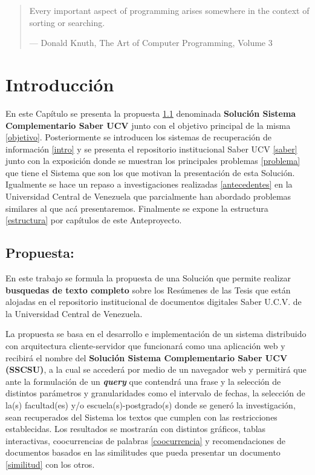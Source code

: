 \documentclass[
  10,
  openany]{book}
\begin{document}
\begin{quote}
Every important aspect of programming arises somewhere in the context of sorting or searching.

--- Donald Knuth, The Art of Computer Programming, Volume 3
\end{quote}

\hypertarget{introduccion}{%
\chapter{Introducción}\label{introduccion}}

En este Capítulo se presenta la propuesta \ref{propuesta} denominada \textbf{Solución Sistema Complementario Saber UCV} junto con el objetivo principal de la misma \ref{objetivo}. Posteriormente se introducen los sistemas de recuperación de información \ref{intro} y se presenta el repositorio institucional Saber UCV \ref{saber} junto con la exposición donde se muestran los principales problemas \ref{problema} que tiene el Sistema que son los que motivan la presentación de esta Solución. Igualmente se hace un repaso a investigaciones realizadas \ref{antecedentes} en la Universidad Central de Venezuela que parcialmente han abordado problemas similares al que acá presentaremos. Finalmente se expone la estructura \ref{estructura} por capítulos de este Anteproyecto.

\hypertarget{propuesta}{%
\section{Propuesta:}\label{propuesta}}

En este trabajo se formula la propuesta de una Solución que permite realizar \textbf{busquedas de texto completo} sobre los Resúmenes de las Tesis que están alojadas en el repositorio institucional de documentos digitales Saber U.C.V. de la Universidad Central de Venezuela.

La propuesta se basa en el desarrollo e implementación de un sistema distribuido con arquitectura cliente-servidor que funcionará como una aplicación web y recibirá el nombre del \textbf{Solución Sistema Complementario Saber UCV (SSCSU)}, a la cual se accederá por medio de un navegador web y permitirá que ante la formulación de un \textbf{\emph{query}} que contendrá una frase y la selección de distintos parámetros y granularidades como el intervalo de fechas, la selección de la(s) facultad(es) y/o escuela(s)-postgrado(s) donde se generó la investigación, sean recuperados del Sistema los textos que cumplen con las restricciones establecidas. Los resultados se mostrarán con distintos gráficos, tablas interactivas, coocurrencias de palabras \ref{coocurrencia} y recomendaciones de documentos basados en las similitudes que pueda presentar un documento \ref{similitud} con los otros.
\end{document}
